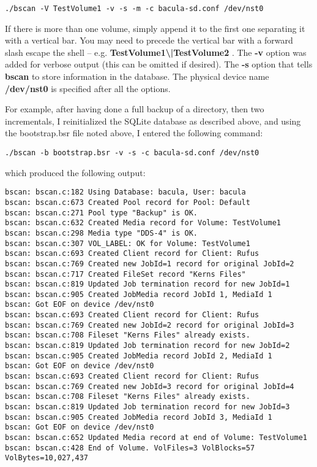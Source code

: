 \footnotesize
\begin{verbatim}
./bscan -V TestVolume1 -v -s -m -c bacula-sd.conf /dev/nst0
\end{verbatim}
\normalsize

If there is more than one volume, simply append it to the first one separating
it with a vertical bar. You may need to precede the vertical bar with a
forward slash escape the shell -- e.g. {\bf
TestVolume1\textbackslash{}|TestVolume2 }. The {\bf -v} option was added for
verbose output (this can be omitted if desired). The {\bf -s} option that
tells {\bf bscan} to store information in the database. The physical device
name {\bf /dev/nst0} is specified after all the options. 

{\bf } For example, after having done a full backup of a directory, then two
incrementals, I reinitialized the SQLite database as described above, and
using the bootstrap.bsr file noted above, I entered the following command: 

\footnotesize
\begin{verbatim}
./bscan -b bootstrap.bsr -v -s -c bacula-sd.conf /dev/nst0
\end{verbatim}
\normalsize

which produced the following output: 

\footnotesize
\begin{verbatim}
bscan: bscan.c:182 Using Database: bacula, User: bacula
bscan: bscan.c:673 Created Pool record for Pool: Default
bscan: bscan.c:271 Pool type "Backup" is OK.
bscan: bscan.c:632 Created Media record for Volume: TestVolume1
bscan: bscan.c:298 Media type "DDS-4" is OK.
bscan: bscan.c:307 VOL_LABEL: OK for Volume: TestVolume1
bscan: bscan.c:693 Created Client record for Client: Rufus
bscan: bscan.c:769 Created new JobId=1 record for original JobId=2
bscan: bscan.c:717 Created FileSet record "Kerns Files"
bscan: bscan.c:819 Updated Job termination record for new JobId=1
bscan: bscan.c:905 Created JobMedia record JobId 1, MediaId 1
bscan: Got EOF on device /dev/nst0
bscan: bscan.c:693 Created Client record for Client: Rufus
bscan: bscan.c:769 Created new JobId=2 record for original JobId=3
bscan: bscan.c:708 Fileset "Kerns Files" already exists.
bscan: bscan.c:819 Updated Job termination record for new JobId=2
bscan: bscan.c:905 Created JobMedia record JobId 2, MediaId 1
bscan: Got EOF on device /dev/nst0
bscan: bscan.c:693 Created Client record for Client: Rufus
bscan: bscan.c:769 Created new JobId=3 record for original JobId=4
bscan: bscan.c:708 Fileset "Kerns Files" already exists.
bscan: bscan.c:819 Updated Job termination record for new JobId=3
bscan: bscan.c:905 Created JobMedia record JobId 3, MediaId 1
bscan: Got EOF on device /dev/nst0
bscan: bscan.c:652 Updated Media record at end of Volume: TestVolume1
bscan: bscan.c:428 End of Volume. VolFiles=3 VolBlocks=57 VolBytes=10,027,437
\end{verbatim}
\normalsize


